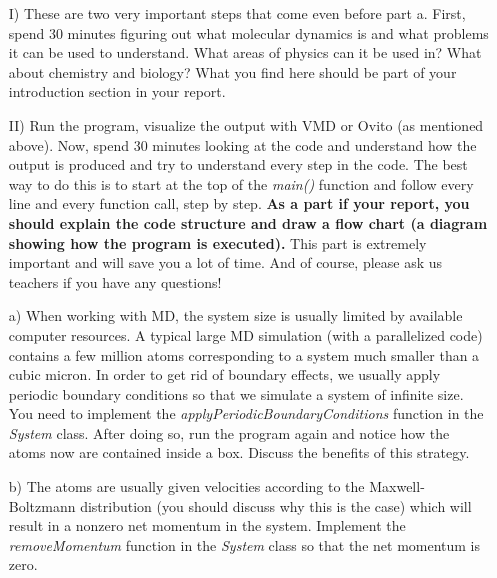 \documentclass[11pt,a4wide]{article}
\begin{document}
\begin{enumerate}
\item[I)] These are two very important steps that come even before part a. First, spend 30 minutes figuring out what molecular dynamics is and what problems it can be used to understand. What areas of physics can it be used in? What about chemistry and biology? What you find here should be part of your introduction section in your report. 
\item[II)] Run the program, visualize the output with VMD or Ovito (as mentioned above). Now, spend 30 minutes looking at the code and understand how the output is produced and try to understand every step in the code. The best way to do this is to start at the top of the \textit{main()} function and follow every line and every function call, step by step. \textbf{As a part if your report, you should explain the code structure and draw a flow chart (a diagram showing how the program is executed).} This part is extremely important and will save you a lot of time. And of course, please ask us teachers if you have any questions!

\item[a)] 
When working with MD, the system size is usually limited by available computer resources. A typical large MD simulation (with a parallelized code) contains a few million atoms corresponding to a system much smaller than a cubic micron. In order to get rid of boundary effects, we usually apply periodic boundary conditions so that we simulate a system of infinite size. You need to implement the \textit{applyPeriodicBoundaryConditions} function in the \textit{System} class. After doing so, run the program again and notice how the atoms now are contained inside a box. Discuss the benefits of this strategy.

\item[b)] 
The atoms are usually given velocities according to the Maxwell-Boltzmann distribution (you should discuss why this is the case) which will result in a nonzero net momentum in the system. Implement the \textit{removeMomentum} function in the \textit{System} class so that the net momentum is zero.
 

\end{enumerate}
\end{document}
